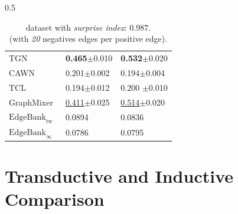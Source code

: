 \begin{table}[t]
\begin{subtable}[t]{0.5\textwidth}
{\begin{tabular}{ l | l l}
    TGN~\cite{rossi2020temporal}                & \textbf{0.465}\scriptsize{$\pm$0.010}  & \textbf{0.532}\scriptsize{$\pm$0.020}\\
    CAWN\cite{wanginductive}               & 0.201\scriptsize{$\pm$0.002}   & 0.194\scriptsize{$\pm$0.004} \\
    TCL~\cite{wang2021tcl}                & 0.194\scriptsize{$\pm$0.012} & 0.200 \scriptsize{$\pm$0.010} \\
    GraphMixer~\cite{congwe}         & \underline{0.411}\scriptsize{$\pm$0.025}  & \underline{0.514}\scriptsize{$\pm$0.020} \\
    $\text{EdgeBank}_{\text{tw}}$~\cite{poursafaeitowards}   & 0.0894 & 0.0836   \\
    $\text{EdgeBank}_{\infty}$~\cite{poursafaeitowards}      & 0.0786      & 0.0795    \\
    \bottomrule
\end{tabular}
}
\caption{\textcolor[HTML]{e7298a}{\review} dataset with \emph{surprise index}: $0.987$. \\ (with \emph{20} negatives edges per positive edge).}
\label{tab:review-20}
\end{subtable}%
\vspace{-10pt}
\end{table}


\section{Transductive and Inductive Comparison}

